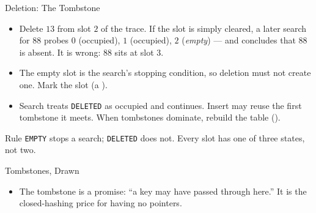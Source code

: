 \documentclass[aspectratio=169]{beamer}
\begin{document}
\begin{frame}{Deletion: The Tombstone}
  \begin{itemize}
    \item Delete $13$ from slot $2$ of the trace. If the slot is simply
      cleared, a later search for $88$ probes $0$ (occupied), $1$ (occupied),
      $2$ (\emph{empty}) --- and concludes that $88$ is absent. It is wrong:
      $88$ sits at slot $3$.
    \item The empty slot is the search's stopping condition, so deletion must
      not create one. Mark the slot  (a ).
    \item Search treats \texttt{DELETED} as occupied and continues. Insert may
      reuse the first tombstone it meets. When tombstones dominate, rebuild
      the table ().
  \end{itemize}
  \begin{alertblock}{Rule}
    \texttt{EMPTY} stops a search; \texttt{DELETED} does not. Every slot has
    one of three states, not two.
  \end{alertblock}
\end{frame}

\begin{frame}{Tombstones, Drawn}
  \begin{center}
  \end{center}
  \vspace{-0.2cm}
  \begin{itemize}
    \item The tombstone is a promise: ``a key may have passed through here.''
      It is the closed-hashing price for having no pointers.
  \end{itemize}
\end{frame}
\end{document}
